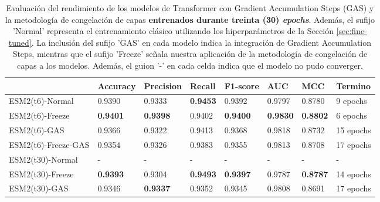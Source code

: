 \begin{table}[]
	\centering
	\caption[Comparación de los modelos Transformer entrenados por 30 \textit{epochs}.]{
		Evaluación del rendimiento de los modelos de Transformer con Gradient Accumulation Steps (GAS) y la metodología de congelación de capas \textbf{entrenados durante treinta (30) \textit{epochs}}. Además, el sufijo 'Normal' representa el entrenamiento clásico utilizando los hiperparámetros de la Sección \ref{sec:fine-tuned}. La inclusión del sufijo 'GAS' en cada modelo indica la integración de Gradient Accumulation Steps, mientras que el sufijo 'Freeze' señala nuestra aplicación de la metodología de congelación de capas a los modelos. Además, el guion '-' en cada celda indica que el modelo no pudo converger.}
	\label{tab:comparison}
	\scriptsize
	\setlength{\tabcolsep}{0.5em} %
	{\renewcommand{\arraystretch}{1.5}%
	\begin{tabular}{llllllll} 
		\textbf{}            & \textbf{Accuracy} & \textbf{Precision} & \textbf{Recall} & \textbf{F1-score} & \textbf{AUC}    & \textbf{MCC}    & \textbf{Termino} \\ \midrule
		ESM2(t6)-Normal             & 0.9390            & 0.9333             & \textbf{0.9453} & 0.9392            & 0.9797          & 0.8780          & 9 epochs            \\
		ESM2(t6)-Freeze      & \textbf{0.9401}   & \textbf{0.9398}    & 0.9402          & \textbf{0.9400}   & \textbf{0.9830} & \textbf{0.8802} & 6 epochs            \\
		ESM2(t6)-GAS         & 0.9366            & 0.9322             & 0.9413          & 0.9368            & 0.9818          & 0.8732          & 15 epochs           \\
		ESM2(t6)-Freeze-GAS  & 0.9354            & 0.9326             & 0.9383          & 0.9355            & 0.9813          & 0.8708          & 17 epochs           \\ \midrule
		ESM2(t30)-Normal            & -                 & -                  & -               & -                 & -               & -               & -                   \\
		ESM2(t30)-Freeze     & \textbf{0.9393}   & 0.9304             & \textbf{0.9493} & \textbf{0.9397}   & 0.9787          & \textbf{0.8787} & 14 epochs           \\
		ESM2(t30)-GAS        & 0.9346            & \textbf{0.9337}    & 0.9352          & 0.9345            & 0.9808          & 0.8691          & 17 epochs           \\

\end{tabular}}
\end{table}
